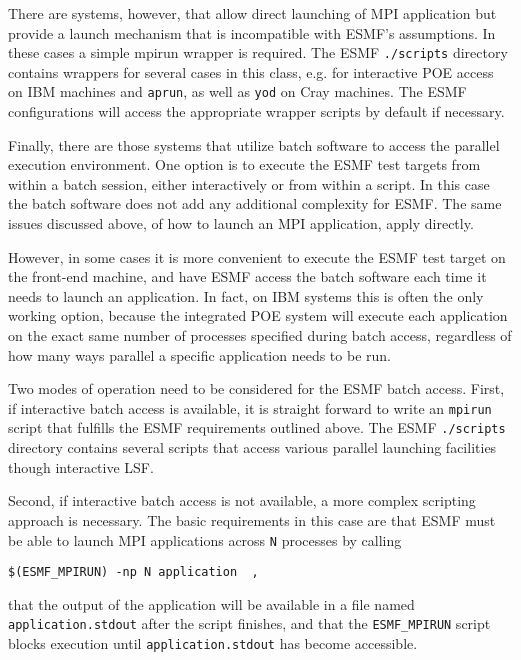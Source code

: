 There are systems, however, that allow direct launching of MPI application but
provide a launch mechanism that is incompatible with ESMF's assumptions. In
these cases a simple mpirun wrapper is required. The ESMF {\tt ./scripts}
directory contains wrappers for several cases in this class, e.g. for
interactive POE access on IBM machines and {\tt aprun}, as well as
{\tt yod} on Cray machines. The ESMF configurations will access the
appropriate wrapper scripts by default if necessary.

Finally, there are those systems that utilize batch software to access the
parallel execution environment. One option is to execute the ESMF test targets
from within a batch session, either interactively or from within a script. In 
this case the batch software does not add any additional complexity for ESMF.
The same issues discussed above, of how to launch an MPI application, apply 
directly. 

However, in some cases it is more convenient to execute the ESMF test target
on the front-end machine, and have ESMF access the batch software each time it
needs to launch an application. In fact, on IBM systems this is often the only
working option, because the integrated POE system will execute each application
on the exact same number of processes specified during batch access, regardless
of how many ways parallel a specific application needs to be run.

Two modes of operation need to be considered for the ESMF batch access. First,
if interactive batch access is available, it is straight forward to write an
{\tt mpirun} script that fulfills the ESMF requirements outlined above. The
ESMF {\tt ./scripts} directory contains several scripts that access various
parallel launching facilities though interactive LSF.

Second, if interactive batch access is not available, a more complex scripting
approach is necessary. The basic requirements in this case are that ESMF must
be able to launch MPI applications across {\tt N} processes by calling

\begin{verbatim}
$(ESMF_MPIRUN) -np N application  ,
\end{verbatim}

that the output of the application will be available in a file named
{\tt application.stdout} after the script finishes, and that the
{\tt ESMF\_MPIRUN} script blocks execution until {\tt application.stdout}
has become accessible.

